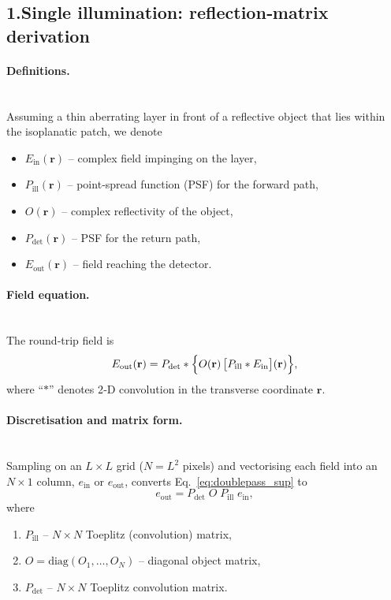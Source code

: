 \documentclass[12pt]{article}
\begin{document}
\subsection{1.\quad Single illumination: reflection‑matrix derivation}
\label{subsec:R_derivation}

\paragraph{Definitions.}~\\
Assuming a thin aberrating layer in front of a reflective object that lies
within the isoplanatic patch, we denote
\begin{itemize}
  \item $E_{\text{in}}(\mathbf r)$ – complex field impinging on the layer,
  \item $P_{\text{ill}}(\mathbf r)$ – point‑spread function (PSF) for the forward path,
  \item $O(\mathbf r)$ – complex reflectivity of the object,
  \item $P_{\text{det}}(\mathbf r)$ – PSF for the return path,
  \item $E_{\text{out}}(\mathbf r)$ – field reaching the detector.
\end{itemize}

\paragraph{Field equation.}~\\
The round‑trip field is
\begin{equation}
E_{\text{out}}(\mathbf r)=
P_{\text{det}} \ast
\Bigl\{
  O(\mathbf r)\,
  \bigl[P_{\text{ill}}\ast E_{\text{in}}\bigr](\mathbf r)
\Bigr\},
\label{eq:doublepass_sup}
\end{equation}
where “$\ast$” denotes 2‑D convolution in the transverse coordinate
$\mathbf r$.

\paragraph{Discretisation and matrix form.}~\\
Sampling on an $L\times L$ grid ($N=L^{2}$ pixels) and vectorising each field
into an $N\times1$ column, $e_{\text{in}}$ or $e_{\text{out}}$, converts
Eq.~\eqref{eq:doublepass_sup} to
\begin{equation}
e_{\text{out}}=
P_{\text{det}}\;
O\;
P_{\text{ill}}\;
e_{\text{in}},
\label{eq:R_matrix_form}
\end{equation}
where
\begin{enumerate}
  \item $P_{\text{ill}}$ – $N\times N$ Toeplitz (convolution) matrix,
  \item $O=\mathrm{diag}(O_{1},\dots,O_{N})$ – diagonal object matrix,
  \item $P_{\text{det}}$ – $N\times N$ Toeplitz convolution matrix.
\end{enumerate}
\end{document}
